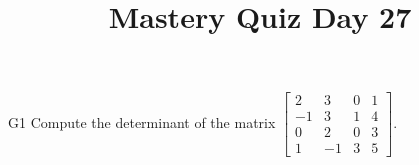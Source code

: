 \documentclass{sbgLAquiz}
\title{Mastery Quiz Day 27 }
\begin{document}
\begin{problem}{G1}
Compute the determinant of the matrix $\begin{bmatrix} 2 & 3 & 0 & 1 \\ -1 & 3 & 1 & 4 \\ 0 & 2 & 0 & 3 \\ 1 & -1 & 3 & 5 \end{bmatrix}$.
\end{problem}
\end{document}
